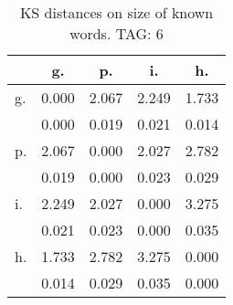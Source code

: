 \begin{table}[h!]
\begin{center}
\begin{tabular}{| l | c | c | c | c |}\hline
 & g. & p. & i. & h. \\\hline
g. & 0.000  & 2.067  & 2.249  & 1.733 \\\hline
 & 0.000  & 0.019  & 0.021  & 0.014 \\\hline
p. & 2.067  & 0.000  & 2.027  & 2.782 \\\hline
 & 0.019  & 0.000  & 0.023  & 0.029 \\\hline
i. & 2.249  & 2.027  & 0.000  & 3.275 \\\hline
 & 0.021  & 0.023  & 0.000  & 0.035 \\\hline
h. & 1.733  & 2.782  & 3.275  & 0.000 \\\hline
 & 0.014  & 0.029  & 0.035  & 0.000 \\\hline
\end{tabular}
\caption{KS distances on size of known words. TAG: 6}
\end{center}
\end{table}